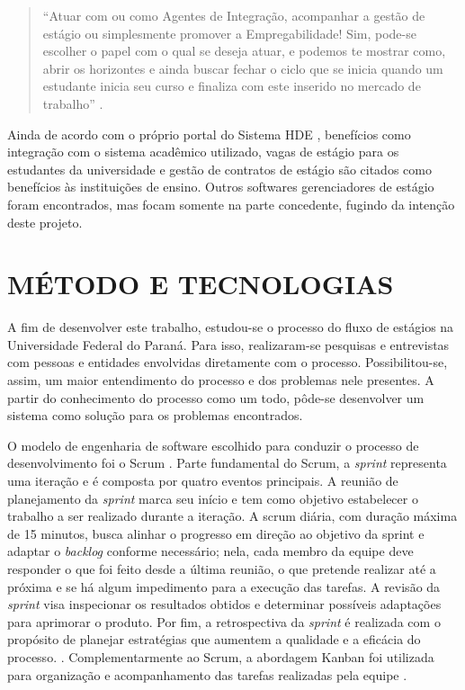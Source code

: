 \documentclass[conference,a4paper,10pt]{IEEETran}
\begin{document}
\begin{quote}
``Atuar com ou como Agentes de Integração, acompanhar a gestão de estágio ou simplesmente promover a Empregabilidade! Sim, pode-se escolher o
papel com o qual se deseja atuar, e podemos te mostrar como, abrir os horizontes e ainda buscar fechar o ciclo que se inicia quando um estudante inicia seu curso e finaliza com este inserido no mercado de trabalho'' \cite{sistemahde}.
\end{quote}

Ainda de acordo com o próprio portal do Sistema HDE \cite{sistemahde}, benefícios como integração com o sistema acadêmico utilizado, vagas de estágio para os estudantes da universidade e gestão de contratos de estágio são citados como benefícios às instituições de ensino.
Outros softwares gerenciadores de estágio foram encontrados, mas focam somente na parte concedente, fugindo da intenção deste projeto.

\section{MÉTODO E TECNOLOGIAS} \label{sec:mettecn}

A fim de desenvolver este trabalho, estudou-se o processo do fluxo de estágios na Universidade Federal do Paraná. Para isso, realizaram-se pesquisas e entrevistas com pessoas e entidades envolvidas diretamente com o processo. Possibilitou-se, assim, um maior entendimento do processo e dos problemas nele presentes. A partir do conhecimento do processo como um todo, pôde-se desenvolver um sistema como solução para os problemas encontrados.

O modelo de engenharia de software escolhido para conduzir o processo de desenvolvimento foi o Scrum \cite{schwaber2020}. Parte fundamental do Scrum, a \textit{sprint} representa uma iteração e é composta por quatro eventos principais. A reunião de planejamento da \textit{sprint} marca seu início e tem como objetivo estabelecer o trabalho a ser realizado durante a iteração. A scrum diária, com duração máxima de 15 minutos, busca alinhar o progresso em direção ao objetivo da sprint e adaptar o \textit{backlog} conforme necessário; nela, cada membro da equipe deve responder o que foi feito desde a última reunião, o que pretende realizar até a próxima e se há algum impedimento para a execução das tarefas. A revisão da \textit{sprint} visa inspecionar os resultados obtidos e determinar possíveis adaptações para aprimorar o produto. Por fim, a retrospectiva da \textit{sprint} é realizada com o propósito de planejar estratégias que aumentem a qualidade e a eficácia do processo. \cite{schwaber2020}. Complementarmente ao Scrum, a abordagem Kanban foi utilizada para organização e acompanhamento das tarefas realizadas pela equipe \cite{gross2003}.
\end{document}
